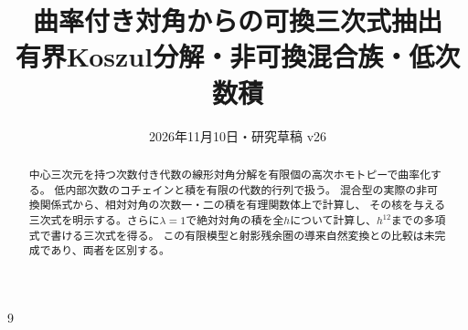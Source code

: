 \documentclass[a4paper,11pt]{ltjsarticle}
\title{曲率付き対角からの可換三次式抽出\\
\large 有界Koszul分解・非可換混合族・低次数積}
\author{}
\date{2026年11月10日・研究草稿 v26}
\theoremstyle{definition}
\begin{document}
\maketitle
\begin{abstract}
中心三次元を持つ次数付き代数の線形対角分解を有限個の高次ホモトピーで曲率化する。
低内部次数のコチェインと積を有限の代数的行列で扱う。
混合型の実際の非可換関係式から、相対対角の次数一・二の積を有理関数体上で計算し、
その核を与える三次式を明示する。さらに$\lambda=1$で絶対対角の積を全$h$について計算し、$h^{12}$までの多項式で書ける三次式を得る。
この有限模型と射影残余圏の導来自然変換との比較は未完成であり、両者を区別する。
\end{abstract}
\tableofcontents

\begin{thebibliography}{9}

\end{thebibliography}
\end{document}
